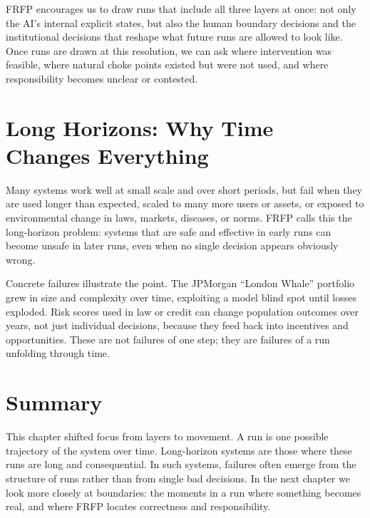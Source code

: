 FRFP encourages us to draw runs that include all three layers at once: not only the AI’s internal explicit states, but also the human boundary decisions and the institutional decisions that reshape what future runs are allowed to look like. Once runs are drawn at this resolution, we can ask where intervention was feasible, where natural choke points existed but were not used, and where responsibility becomes unclear or contested.

\section{Long Horizons: Why Time Changes Everything}

Many systems work well at small scale and over short periods, but fail when they are used longer than expected, scaled to many more users or assets, or exposed to environmental change in laws, markets, diseases, or norms. FRFP calls this the long-horizon problem: systems that are safe and effective in early runs can become unsafe in later runs, even when no single decision appears obviously wrong.

Concrete failures illustrate the point. The JPMorgan ``London Whale'' portfolio grew in size and complexity over time, exploiting a model blind spot until losses exploded. Risk scores used in law or credit can change population outcomes over years, not just individual decisions, because they feed back into incentives and opportunities. These are not failures of one step; they are failures of a run unfolding through time.

\section{Summary}

This chapter shifted focus from layers to movement. A run is one possible trajectory of the system over time. Long-horizon systems are those where these runs are long and consequential. In such systems, failures often emerge from the structure of runs rather than from single bad decisions. In the next chapter we look more closely at boundaries: the moments in a run where something becomes real, and where FRFP locates correctness and responsibility.

